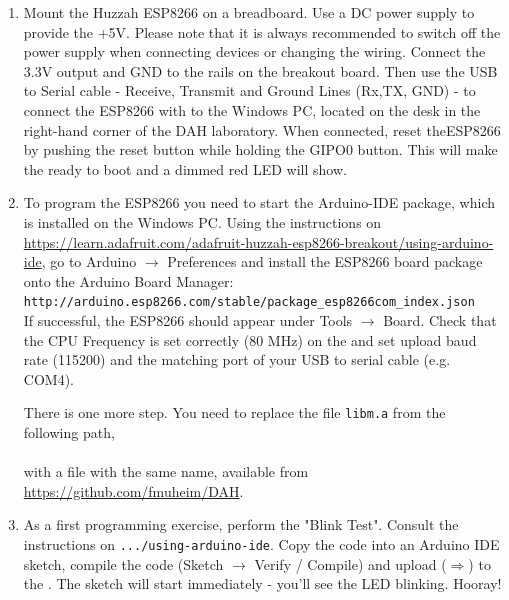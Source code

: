\begin{enumerate}

\item Mount the Huzzah ESP8266 \microcontroller on a breadboard. 
Use a DC power supply to provide the +5V. 
Please note that it is always recommended to switch off the power supply when connecting devices or changing the wiring.
Connect the 3.3V output and GND to the rails on the breakout board. 
Then use the USB  to Serial cable - Receive, Transmit and Ground Lines (Rx,TX, GND) -
to connect the ESP8266 with to the Windows PC, 
located on the desk in the right-hand corner of the DAH laboratory. 
When connected, reset  theESP8266 by  pushing the
reset button while holding the GIPO0 button. 
This will make the \microcontroller ready to boot 
and a dimmed red LED will show.

\item To program the  ESP8266  you need to start the Arduino-IDE package, 
which is installed on the Windows PC. Using the instructions on
\url{https://learn.adafruit.com/adafruit-huzzah-esp8266-breakout/using-arduino-ide},
go to Arduino $\rightarrow$ Preferences and install the ESP8266 board package 
onto the Arduino Board Manager:
\hspace*{5mm} {\tt http://arduino.esp8266.com/stable/package\_esp8266com\_index.json}\\
If successful, the  ESP8266 should appear under Tools $\rightarrow$ Board. 
Check that the CPU Frequency is set correctly (80 MHz) on the \microcontroller
and set upload baud rate (115200)  and the matching port of your USB to serial cable (e.g. COM4).

There is one more step. You need to replace the file {\tt libm.a} from the following path,\\
\\ with a file with the same name, available from  \url{https://github.com/fmuheim/DAH}. 


\item As a first  programming exercise, perform the "Blink Test". Consult the instructions on
{\tt .../using-arduino-ide}.
Copy the code into an Arduino IDE sketch, compile the code (Sketch $\rightarrow$ Verify / Compile) and upload ($\Rightarrow$) to the \microcontroller. 
The sketch will start immediately - you'll see the LED blinking. Hooray!


\end{enumerate}
